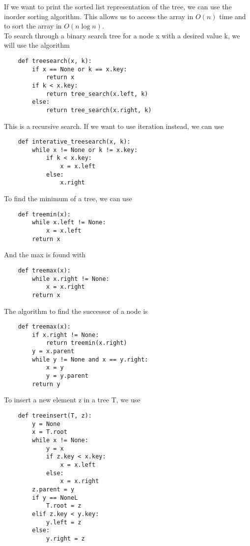 \documentclass[]{article}
\begin{document}

If we want to print the sorted list representation of the tree, we can use the inorder sorting algorithm. This allows us to access the array in $O(n)$ time and to sort the array in $O(n\log n)$.\\

To search through a binary search tree for a node x with a desired value k, we will use the algorithm

\begin{lstlisting}
	def treesearch(x, k):
		if x == None or k == x.key:
			return x
		if k < x.key:
			return tree_search(x.left, k)
		else:
			return tree_search(x.right, k)
\end{lstlisting}\bigbreak

This is a recursive search. If we want to use iteration instead, we can use

\begin{lstlisting}
	def interative_treesearch(x, k):
		while x != None or k != x.key:
			if k < x.key:
				x = x.left
			else:
				x.right
\end{lstlisting}\bigbreak

To find the minimum of a tree, we can use

\begin{lstlisting}
	def treemin(x):	
		while x.left != None:
			x = x.left
		return x
\end{lstlisting}\bigbreak

And the max is found with

\begin{lstlisting}
	def treemax(x):	
		while x.right != None:
			x = x.right
		return x
\end{lstlisting}\bigbreak

The algorithm to find the successor of a node is

\begin{lstlisting}
	def treemax(x):	
		if x.right != None:
			return treemin(x.right)
		y = x.parent
		while y != None and x == y.right:	
			x = y
			y = y.parent
		return y
\end{lstlisting}\bigbreak

To insert a new element z in a tree T, we use

\begin{lstlisting}
	def treeinsert(T, z):
		y = None
		x = T.root
		while x != None:
			y = x
			if z.key < x.key:
				x = x.left
			else:
				x = x.right
		z.parent = y
		if y == NoneL
			T.root = z
		elif z.key < y.key:
			y.left = z
		else:
			y.right = z
\end{lstlisting}\bigbreak
\end{document}
